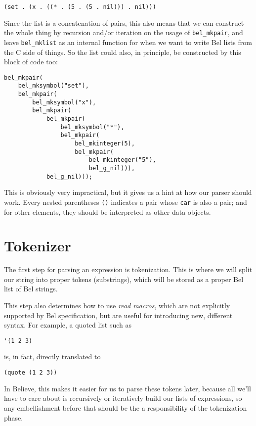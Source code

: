 \documentclass[openright,a4paper,twoside,12pt]{memoir}
\begin{document}
\begin{verbatim}
(set . (x . ((* . (5 . (5 . nil))) . nil)))
\end{verbatim}

Since the  list is a concatenation  of pairs, this also  means that we
can construct  the whole  thing by recursion  and/or iteration  on the
usage of \texttt{bel\_mkpair}, and leave  \texttt{bel\_mklist} as an internal function for
when we want to write Bel lists from the C side of things. So the list
could also, in principle, be constructed by this block of code too:

\begin{verbatim}
bel_mkpair(
    bel_mksymbol("set"),
    bel_mkpair(
        bel_mksymbol("x"),
        bel_mkpair(
            bel_mkpair(
                bel_mksymbol("*"),
                bel_mkpair(
                    bel_mkinteger(5),
                    bel_mkpair(
                        bel_mkinteger("5"),
                        bel_g_nil))),
            bel_g_nil)));
\end{verbatim}

This is obviously very impractical, but it  gives us a hint at how our
parser should work. Every nested parentheses \texttt{()} indicates a pair whose
\texttt{car} is also a pair; and for other elements, they should be interpreted
as other data objects.

\section{Tokenizer}
\label{sec:org9645f29}

The  first step  for parsing  an expression  is tokenization.  This is
where we will split our  string into proper tokens (substrings), which
will be stored as a proper Bel list of Bel strings.

This  step also  determines  how to  use \emph{read  macros},  which are  not
explicitly  supported  by  Bel   specification,  but  are  useful  for
introducing new, different syntax. For example, a quoted list such as

\begin{verbatim}
'(1 2 3)
\end{verbatim}

is, in fact, directly translated to

\begin{verbatim}
(quote (1 2 3))
\end{verbatim}

In Believe, this  makes it easier for us to  parse these tokens later,
because all  we'll have  to care about  is recursively  or iteratively
build  our lists  of  expressions, so  any  embellishment before  that
should be the a responsibility of the tokenization phase.
\end{document}

